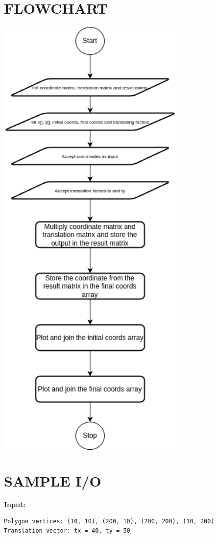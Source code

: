 \documentclass{article}
\begin{document}
\section*{FLOWCHART}
\begin{center}
\includegraphics[width=0.7\textwidth]{flowchart.png}
\end{center}

\section*{SAMPLE I/O}
\textbf{Input:}
\begin{verbatim}
Polygon vertices: (10, 10), (200, 10), (200, 200), (10, 200)
Translation vector: tx = 40, ty = 50
\end{verbatim}
\end{document}
